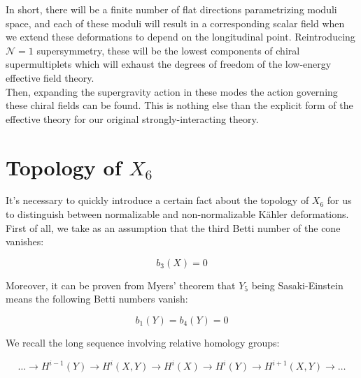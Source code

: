 In short, there will be a finite number of flat directions parametrizing moduli space, and each of these moduli will result in a corresponding scalar field when we extend these deformations to depend on the longitudinal point. Reintroducing $\mathcal{N}=1$ supersymmetry, these will be the lowest components of chiral supermultiplets which will exhaust the degrees of freedom of the low-energy effective field theory.\\

Then, expanding the supergravity action in these modes the action governing these chiral fields can be found. This is nothing else than the explicit form of the effective theory for our original strongly-interacting theory.

\section{Topology of $X_6$}

It's necessary to quickly introduce a certain fact about the topology of $X_6$ for us to distinguish between normalizable and non-normalizable K\"ahler deformations. First of all, we take as an assumption that the third Betti number of the cone vanishes:

\begin{equation}
	b_3(X) = 0 \label{bettiX3}
\end{equation}

Moreover, it can be proven from Myers' theorem that $Y_5$ being Sasaki-Einstein means the following Betti numbers vanish:

\begin{equation}
	b_1(Y) = b_4(Y) = 0 \label{bettiY14}
\end{equation}




We recall the long sequence involving relative homology groups:

\begin{equation}
	\ldots \rightarrow H^{i-1}(Y) \rightarrow H^{i}(X,Y) \rightarrow H^i(X) \rightarrow H^i(Y) \rightarrow H^{i+1}(X,Y) \rightarrow \ldots
\end{equation}

